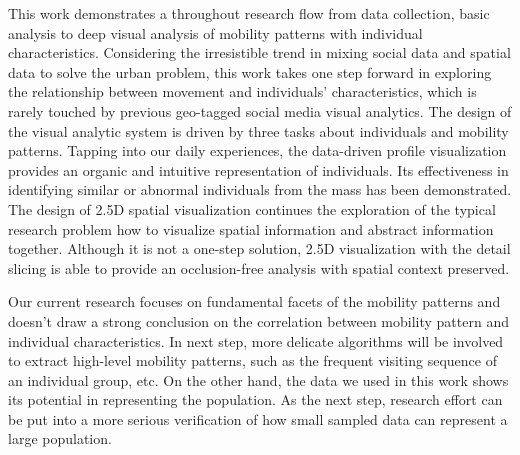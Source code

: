 This work demonstrates a throughout research flow from data collection, basic analysis to deep visual analysis of mobility patterns with individual characteristics. Considering the irresistible trend in mixing social data and spatial data to solve the urban problem, this work takes one step forward in exploring the relationship between movement and individuals' characteristics, which is rarely touched by previous geo-tagged social media visual analytics. The design of the visual analytic system is driven by three tasks about individuals and mobility patterns. Tapping into our daily experiences, the data-driven profile visualization provides an organic and intuitive representation of individuals. Its effectiveness in identifying similar or abnormal individuals from the mass has been demonstrated. The design of 2.5D spatial visualization continues the exploration of the typical research problem how to visualize spatial information and abstract information together. Although it is not a one-step solution, 2.5D visualization with the detail slicing is able to provide an occlusion-free analysis with spatial context preserved.

Our current research focuses on fundamental facets of the mobility patterns and doesn't draw a strong conclusion on the correlation between mobility pattern and individual characteristics. In next step, more delicate algorithms will be involved to extract high-level mobility patterns, such as the frequent visiting sequence of an individual group, etc. On the other hand, the data we used in this work shows its potential in representing the population. As the next step, research effort can be put into a more serious verification of how small sampled data can represent a large population.



%




